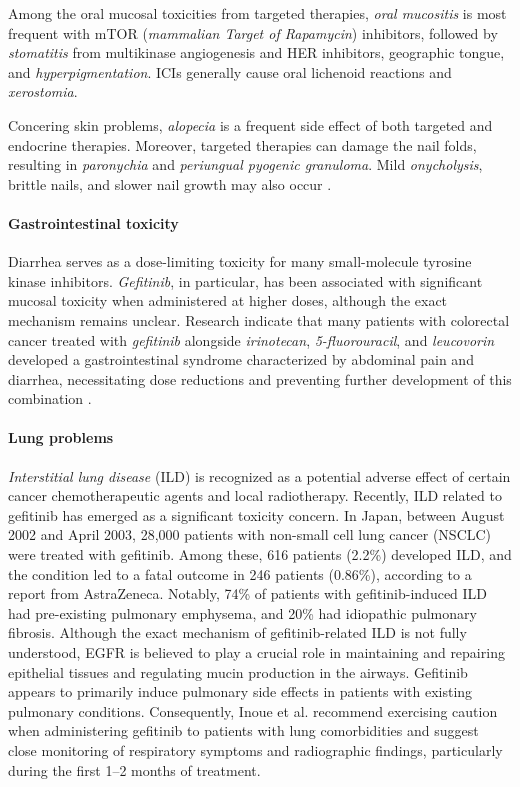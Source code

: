 Among the oral mucosal toxicities from targeted therapies, \textit{oral mucositis} is most frequent with mTOR (\textit{mammalian Target of Rapamycin}) inhibitors, followed by \textit{stomatitis} from multikinase angiogenesis and HER inhibitors, geographic tongue, and \textit{hyperpigmentation}. ICIs generally cause oral lichenoid reactions and \textit{xerostomia}.

Concering skin problems, \textit{alopecia} is a frequent side effect of both targeted and endocrine therapies. Moreover, targeted therapies can damage the nail folds, resulting in \textit{paronychia} and \textit{periungual pyogenic granuloma}. Mild \textit{onycholysis}, brittle nails, and slower nail growth may also occur \cite{skin_nails}.

\paragraph{Gastrointestinal toxicity}

Diarrhea serves as a dose-limiting toxicity for many small-molecule tyrosine kinase inhibitors. \textit{Gefitinib}, in particular, has been associated with significant mucosal toxicity when administered at higher doses, although the exact mechanism remains unclear. Research indicate that many patients with colorectal cancer treated with \textit{gefitinib} alongside \textit{irinotecan}, \textit{5-fluorouracil}, and \textit{leucovorin} developed a gastrointestinal syndrome characterized by abdominal pain and diarrhea, necessitating dose reductions and preventing further development of this combination \cite{se_tt}.

\paragraph{Lung problems}

\textit{Interstitial lung disease} (ILD) is recognized as a potential adverse effect of certain cancer chemotherapeutic agents and local radiotherapy. Recently, ILD related to gefitinib has emerged as a significant toxicity concern. In Japan, between August 2002 and April 2003, 28,000 patients with non-small cell lung cancer (NSCLC) were treated with gefitinib. Among these, 616 patients (2.2\%) developed ILD, and the condition led to a fatal outcome in 246 patients (0.86\%), according to a report from AstraZeneca. Notably, 74\% of patients with gefitinib-induced ILD had pre-existing pulmonary emphysema, and 20\% had idiopathic pulmonary fibrosis. Although the exact mechanism of gefitinib-related ILD is not fully understood, EGFR is believed to play a crucial role in maintaining and repairing epithelial tissues and regulating mucin production in the airways. Gefitinib appears to primarily induce pulmonary side effects in patients with existing pulmonary conditions. Consequently, Inoue et al. recommend exercising caution when administering gefitinib to patients with lung comorbidities and suggest close monitoring of respiratory symptoms and radiographic findings, particularly during the first 1–2 months of treatment.

\cleardoublepage
